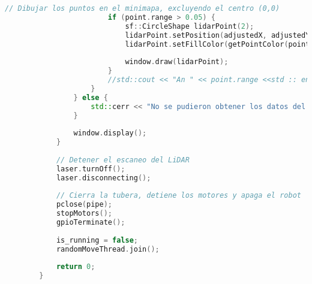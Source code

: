 \begin{lstlisting}[language={C++}, caption={Primer ajuste de c\'odigo}, label={Script}]
                        // Dibujar los puntos en el minimapa, excluyendo el centro (0,0)
                        if (point.range > 0.05) {
                            sf::CircleShape lidarPoint(2);
                            lidarPoint.setPosition(adjustedX, adjustedY);
                            lidarPoint.setFillColor(getPointColor(point.range, max_range));
        
                            window.draw(lidarPoint);
                        }
                        //std::cout << "An " << point.range <<std :: endl;
                    }
                } else {
                    std::cerr << "No se pudieron obtener los datos del LiDAR." << std::endl;
                }
        
                window.display();
            }
        
            // Detener el escaneo del LiDAR
            laser.turnOff();
            laser.disconnecting();
        
            // Cierra la tubera, detiene los motores y apaga el robot
            pclose(pipe);
            stopMotors();
            gpioTerminate();
        
            is_running = false;
            randomMoveThread.join();
        
            return 0;
        }
    \end{lstlisting}
